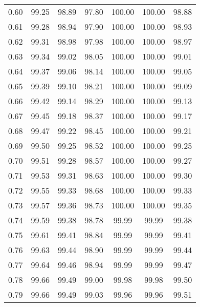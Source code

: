 \begin{tabular}{|c|c|c|c|c|c|c|}
      0.60 &     99.25 &     98.89 &      97.80 &  100.00 &     100.00 &         98.88 \\
      0.61 &     99.28 &     98.94 &      97.90 &  100.00 &     100.00 &         98.93 \\
      0.62 &     99.31 &     98.98 &      97.98 &  100.00 &     100.00 &         98.97 \\
      0.63 &     99.34 &     99.02 &      98.05 &  100.00 &     100.00 &         99.01 \\
      0.64 &     99.37 &     99.06 &      98.14 &  100.00 &     100.00 &         99.05 \\
      0.65 &     99.39 &     99.10 &      98.21 &  100.00 &     100.00 &         99.09 \\
      0.66 &     99.42 &     99.14 &      98.29 &  100.00 &     100.00 &         99.13 \\
      0.67 &     99.45 &     99.18 &      98.37 &  100.00 &     100.00 &         99.17 \\
      0.68 &     99.47 &     99.22 &      98.45 &  100.00 &     100.00 &         99.21 \\
      0.69 &     99.50 &     99.25 &      98.52 &  100.00 &     100.00 &         99.25 \\
      0.70 &     99.51 &     99.28 &      98.57 &  100.00 &     100.00 &         99.27 \\
      0.71 &     99.53 &     99.31 &      98.63 &  100.00 &     100.00 &         99.30 \\
      0.72 &     99.55 &     99.33 &      98.68 &  100.00 &     100.00 &         99.33 \\
      0.73 &     99.57 &     99.36 &      98.73 &  100.00 &     100.00 &         99.35 \\
      0.74 &     99.59 &     99.38 &      98.78 &   99.99 &      99.99 &         99.38 \\
      0.75 &     99.61 &     99.41 &      98.84 &   99.99 &      99.99 &         99.41 \\
      0.76 &     99.63 &     99.44 &      98.90 &   99.99 &      99.99 &         99.44 \\
      0.77 &     99.64 &     99.46 &      98.94 &   99.99 &      99.99 &         99.47 \\
      0.78 &     99.66 &     99.49 &      99.00 &   99.98 &      99.98 &         99.50 \\
      0.79 &     99.66 &     99.49 &      99.03 &   99.96 &      99.96 &         99.51 \\

\end{tabular}
